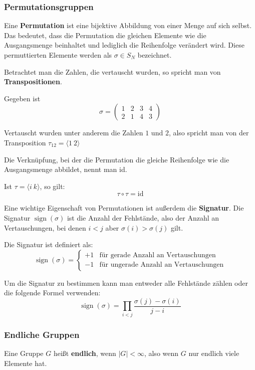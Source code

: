 \documentclass[11pt]{article}
\begin{document}
\subsubsection{Permutationsgruppen}
Eine \textbf{Permutation} ist eine bijektive Abbildung von einer Menge auf sich selbst. Das bedeutet, dass die Permutation
die gleichen Elemente wie die Ausgangsmenge beinhaltet und lediglich die Reihenfolge verändert wird. Diese permuttierten
Elemente werden als $\sigma \in S_N$ bezeichnet.

Betrachtet man die Zahlen, die vertauscht wurden, so spricht man von \textbf{Transpositionen}.
\begin{bsp}
  Gegeben ist
  \[
    \sigma = \begin{pmatrix}
      1 & 2 & 3 & 4 \\
      2 & 1 & 4 & 3
    \end{pmatrix}
  \]

  Vertauscht wurden unter anderem die Zahlen $1$ und $2$, also spricht man von der Transposition $\tau_{12} = \langle1~2\rangle$
\end{bsp}

Die Verknüpfung, bei der die Permutation die gleiche Reihenfolge wie die Ausgangsmenge abbildet, nennt man id.

Ist $\tau = \langle i~k \rangle$, so gilt:
\[
  \tau \circ \tau = \text{id}
\]

Eine wichtige Eigenschaft von Permutationen ist außerdem die \textbf{Signatur}. Die Signatur $\operatorname{sign}(\sigma)$ ist die Anzahl
der Fehlstände, also der Anzahl an Vertauschungen, bei denen $i < j$ aber $\sigma(i) > \sigma(j)$ gilt.

Die Signatur ist definiert als:
\[
  \operatorname{sign}(\sigma) = \begin{cases}
    +1 & \text{für gerade Anzahl an Vertauschungen}   \\
    -1 & \text{für ungerade Anzahl an Vertauschungen}
  \end{cases}
\]

Um die Signatur zu bestimmen kann man entweder alle Fehlstände zählen oder die folgende Formel verwenden:
\[
  \operatorname{sign}(\sigma) = \prod\limits_{i < j}\frac{\sigma(j) - \sigma(i)}{j - i}
\]

\subsubsection{Endliche Gruppen}
Eine Gruppe $G$ heißt \textbf{endlich}, wenn $|G| < \infty$, also wenn $G$ nur endlich viele Elemente hat.
\end{document}
